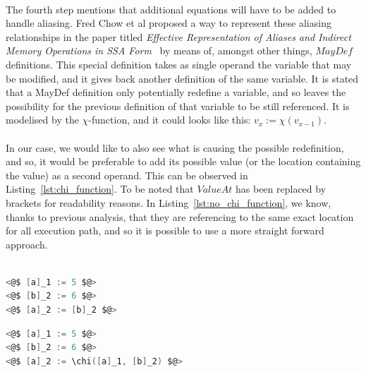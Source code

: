\paragraph{}
The fourth step mentions that additional equations will have to be added to handle aliasing. Fred Chow et al proposed a way to represent these aliasing relationships in the paper titled \textit{Effective Representation of Aliases and Indirect Memory Operations in SSA Form}~\cite{chow1996effective} by means of, amongst other things, $MayDef$ definitions. This special definition takes as single operand the variable that may be modified, and it gives back another definition of the same variable. It is stated that a MayDef definition only potentially redefine a variable, and so leaves the possibility for the previous definition of that variable to be still referenced. It is modelised by the $\chi$-function, and it could looks like this: $v_x := \chi(v_{x-1})$. 

\paragraph{}
In our case, we would like to also see what is causing the possible redefinition, and so, it would be preferable to add its possible value (or the location containing the value) as a second operand. This can be observed in Listing~\ref{lst:chi_function}. To be noted that $ValueAt$ has been replaced by brackets for readability reasons. In Listing~\ref{lst:no_chi_function}, we know, thanks to previous analysis, that they are referencing to the same exact location for all execution path, and so it is possible to use a more straight forward approach. \\ \\

\noindent\begin{minipage}{.45\textwidth}
	\begin{lstlisting}[caption={The memory location a and b are referencing to the same location.}, label={lst:no_chi_function}, frame=tlrb, language=C]
<@$ [a]_1 := 5 $@>
<@$ [b]_2 := 6 $@>
<@$ [a]_2 := [b]_2 $@>
	\end{lstlisting}
\end{minipage}\hfill
\begin{minipage}{.45\textwidth}
	\begin{lstlisting}[caption={The memory location a and b \textbf{may} be referencing to the same location.}, label={lst:chi_function}, frame=tlrb, language=C]
<@$ [a]_1 := 5 $@>
<@$ [b]_2 := 6 $@>
<@$ [a]_2 := \chi([a]_1, [b]_2) $@>
	\end{lstlisting}
\end{minipage}

